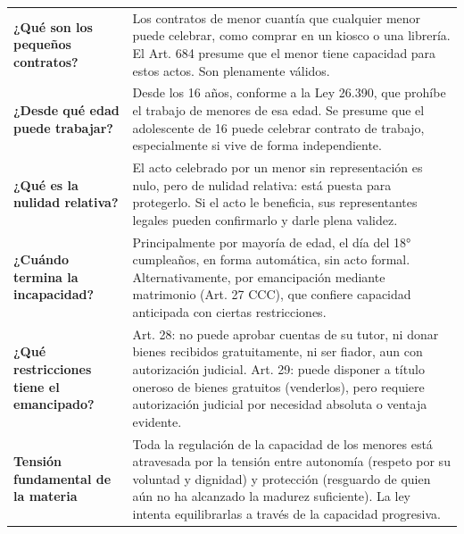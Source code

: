 \documentclass[12pt,oneside]{book}
\begin{document}
\begin{longtable}{
    >{\raggedright\arraybackslash}p{}
    >{\raggedright\arraybackslash}p{}
}
\textbf{¿Qué son los pequeños contratos?} &
Los contratos de menor cuantía que cualquier menor puede celebrar, como comprar en un kiosco o una librería. El Art. 684 presume que el menor tiene capacidad para estos actos. Son plenamente válidos. \\

\textbf{¿Desde qué edad puede trabajar?} &
Desde los 16 años, conforme a la Ley 26.390, que prohíbe el trabajo de menores de esa edad. Se presume que el adolescente de 16 puede celebrar contrato de trabajo, especialmente si vive de forma independiente. \\

\textbf{¿Qué es la nulidad relativa?} &
El acto celebrado por un menor sin representación es nulo, pero de nulidad relativa: está puesta para protegerlo. Si el acto le beneficia, sus representantes legales pueden confirmarlo y darle plena validez. \\

\textbf{¿Cuándo termina la incapacidad?} &
Principalmente por mayoría de edad, el día del 18° cumpleaños, en forma automática, sin acto formal. Alternativamente, por emancipación mediante matrimonio (Art. 27 CCC), que confiere capacidad anticipada con ciertas restricciones. \\

\textbf{¿Qué restricciones tiene el emancipado?} &
Art. 28: no puede aprobar cuentas de su tutor, ni donar bienes recibidos gratuitamente, ni ser fiador, aun con autorización judicial. Art. 29: puede disponer a título oneroso de bienes gratuitos (venderlos), pero requiere autorización judicial por necesidad absoluta o ventaja evidente. \\

\textbf{Tensión fundamental de la materia} &
Toda la regulación de la capacidad de los menores está atravesada por la tensión entre autonomía (respeto por su voluntad y dignidad) y protección (resguardo de quien aún no ha alcanzado la madurez suficiente). La ley intenta equilibrarlas a través de la capacidad progresiva. \\


\end{longtable}
\end{document}
